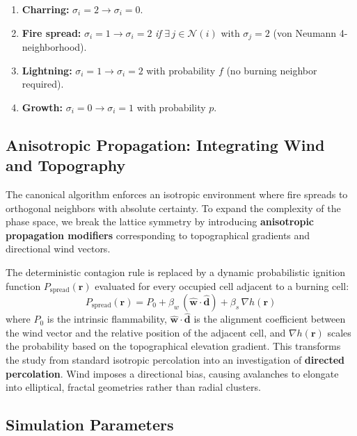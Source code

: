 \documentclass[12pt, a4paper]{article}
\begin{document}
\begin{enumerate}
    \item \textbf{Charring:} $\sigma_i = 2 \to \sigma_i = 0$.
    \item \textbf{Fire spread:} $\sigma_i = 1 \to \sigma_i = 2$ \textit{if} $\exists\, j \in \mathcal{N}(i)$ with $\sigma_j = 2$ (von Neumann 4-neighborhood).
    \item \textbf{Lightning:} $\sigma_i = 1 \to \sigma_i = 2$ with probability $f$ (no burning neighbor required).
    \item \textbf{Growth:} $\sigma_i = 0 \to \sigma_i = 1$ with probability $p$.
\end{enumerate}

\subsection{Anisotropic Propagation: Integrating Wind and Topography}

The canonical algorithm enforces an isotropic environment where fire spreads to orthogonal neighbors with absolute certainty. To expand the complexity of the phase space, we break the lattice symmetry by introducing \textbf{anisotropic propagation modifiers} corresponding to topographical gradients and directional wind vectors.

The deterministic contagion rule is replaced by a dynamic probabilistic ignition function $P_\text{spread}(\mathbf{r})$ evaluated for every occupied cell adjacent to a burning cell:
\begin{equation}
    P_\text{spread}(\mathbf{r}) = P_0 + \beta_w \, (\hat{\mathbf{w}} \cdot \hat{\mathbf{d}}) + \beta_s \, \nabla h(\mathbf{r})
    \label{eq:aniso}
\end{equation}
where $P_0$ is the intrinsic flammability, $\hat{\mathbf{w}} \cdot \hat{\mathbf{d}}$ is the alignment coefficient between the wind vector and the relative position of the adjacent cell, and $\nabla h(\mathbf{r})$ scales the probability based on the topographical elevation gradient. This transforms the study from standard isotropic percolation into an investigation of \textbf{directed percolation}. Wind imposes a directional bias, causing avalanches to elongate into elliptical, fractal geometries rather than radial clusters.

\subsection{Simulation Parameters}
\end{document}
